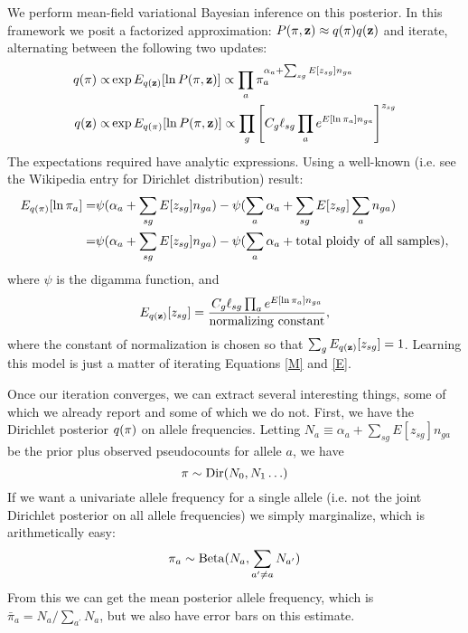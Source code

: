 \documentclass[nofootinbib,amssymb,amsmath]{revtex4}
\newcommand{\vz}{{\bf z}}
\newcommand{\vpi}{{\bf \pi}}
\begin{document}
We perform mean-field variational Bayesian inference on this posterior.  In this framework we posit a factorized approximation: $P(\vpi, \vz) \approx q(\vpi) q(\vz)$ and iterate, alternating between the following two updates:
\begin{align}
q(\vpi) \propto& \exp E_{q(\vz)}[\ln P(\vpi, \vz)] \propto \prod_a \pi_a^{\alpha_a + \sum_{sg} E[z_{sg}] n_{ga}} \label{M}\\
q(\vz) \propto& \exp E_{q(\vpi)}[\ln P(\vpi, \vz)] \propto \prod_g \left[ C_g \ell_{sg} \prod_a e^{ E[\ln \pi_a] n_{ga}} \right]^{z_{sg}} \label{E}
\end{align}
The expectations required have analytic expressions.  Using a well-known (i.e. see the Wikipedia entry for Dirichlet distribution) result:
\begin{align}
E_{q(\vpi)} [ \ln \pi_a ] =& \psi( \alpha_a + \sum_{sg} E[z_{sg}] n_{ga}) - \psi (\sum_a \alpha_a + \sum_{sg} E[z_{sg}]  \sum_a n_{ga}) \\
=& \psi( \alpha_a + \sum_{sg} E[z_{sg}] n_{ga}) - \psi (\sum_a \alpha_a + {\rm total~ploidy~of~all~samples}),
\label{pi_update}
\end{align}
where $\psi$ is the digamma function, and
\begin{align}
E_{q(\vz)}[z_{sg}] = \frac{C_g \ell_{sg} \prod_a e^{ E[\ln \pi_a] n_{ga}}}{\rm normalizing~constant},
\label{z_update}
\end{align}
where the constant of normalization is chosen so that $\sum_g E_{q(\vz)}[z_{sg}] = 1$.  Learning this model is just a matter of iterating Equations \ref{M} and \ref{E}.

Once our iteration converges, we can extract several interesting things, some of which we already report and some of which we do not.  First, we have the Dirichlet posterior $q(\vpi)$ on allele frequencies.  Letting $N_a \equiv \alpha_a + \sum_{sg} E[z_{sg}] n_{ga}$ be the prior plus observed pseudocounts for allele $a$, we have
\begin{equation}
\vpi \sim {\rm Dir}(N_0, N_1 \ldots)
\end{equation}
If we want a univariate allele frequency for a single allele (i.e. not the joint Dirichlet posterior on all allele frequencies) we simply marginalize, which is arithmetically easy:
\begin{equation}
\pi_a \sim {\rm Beta}(N_a, \sum_{a^\prime \ne a} N_{a^\prime})
\end{equation}
From this we can get the mean posterior allele frequency, which is $\bar{\pi}_a = N_a / \sum_{a^\prime} N_a$, but we also have error bars on this estimate.
\end{document}
